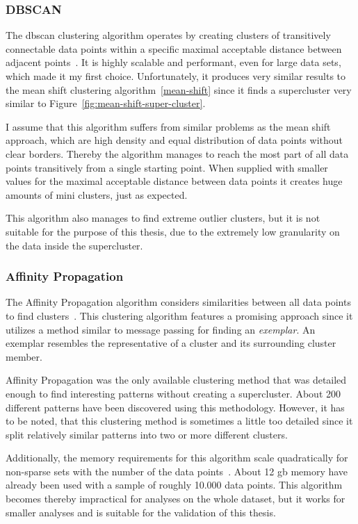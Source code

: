 \subsubsection{DBSCAN}
The \ac{dbscan} clustering algorithm operates by creating clusters of transitively connectable data points within a specific maximal acceptable distance between adjacent points~\cite{inproceedings:dbscan}.
It is highly scalable and performant, even for large data sets, which made it my first choice.
Unfortunately, it produces very similar results to the mean shift clustering algorithm~\ref{mean-shift} since it finds a supercluster very similar to Figure~\ref{fig:mean-shift-super-cluster}.

I assume that this algorithm suffers from similar problems as the mean shift approach, which are high density and equal distribution of data points without clear borders.
Thereby the algorithm manages to reach the most part of all data points transitively from a single starting point.
When supplied with smaller values for the maximal acceptable distance between data points it creates huge amounts of mini clusters, just as expected.

This algorithm also manages to find extreme outlier clusters, but it is not suitable for the purpose of this thesis, due to the extremely low granularity on the data inside the supercluster.


\subsubsection{Affinity Propagation}
The Affinity Propagation algorithm considers similarities between all data points to find clusters~\cite{article:affinity-propagation}.
This clustering algorithm features a promising approach since it utilizes a method similar to message passing for finding an \emph{exemplar}.
An exemplar resembles the representative of a cluster and its surrounding cluster member.

Affinity Propagation was the only available clustering method that was detailed enough to find interesting patterns without creating a supercluster.
About 200 different patterns have been discovered using this methodology.
However, it has to be noted, that this clustering method is sometimes a little too detailed since it split relatively similar patterns into two or more different clusters.

Additionally, the memory requirements for this algorithm scale quadratically for non-sparse sets with the number of the data points~\cite[p.~ii]{article:affinity-propagation}.
About 12 \ac{gb} memory have already been used with a sample of roughly 10.000 data points.
This algorithm becomes thereby impractical for analyses on the whole dataset, but it works for smaller analyses and is suitable for the validation of this thesis.
